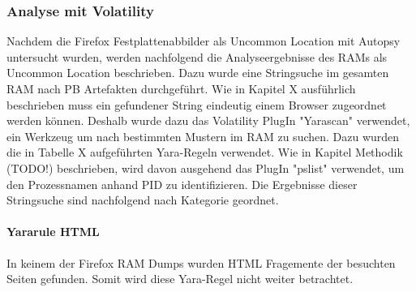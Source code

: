 \subsubsection*{Analyse mit Volatility}
Nachdem die Firefox Festplattenabbilder als Uncommon Location mit Autopsy untersucht wurden, werden nachfolgend die Analyseergebnisse des RAMs als Uncommon Location beschrieben. 
Dazu wurde eine Stringsuche im gesamten RAM nach PB Artefakten durchgeführt.
Wie in Kapitel X ausführlich beschrieben muss ein gefundener String eindeutig einem Browser zugeordnet werden können. 
Deshalb wurde dazu das Volatility PlugIn "Yarascan" verwendet, ein Werkzeug um nach bestimmten Mustern im RAM zu suchen. Dazu wurden die in Tabelle X aufgeführten Yara-Regeln verwendet.
Wie in Kapitel Methodik (TODO!) beschrieben, wird davon ausgehend das PlugIn "pslist" verwendet, um den Prozessnamen anhand PID zu identifizieren.
Die Ergebnisse dieser Stringsuche sind nachfolgend nach Kategorie geordnet.

\paragraph*{Yararule HTML}
In keinem der Firefox RAM Dumps wurden HTML Fragemente der besuchten Seiten gefunden. Somit wird diese Yara-Regel nicht weiter betrachtet.

